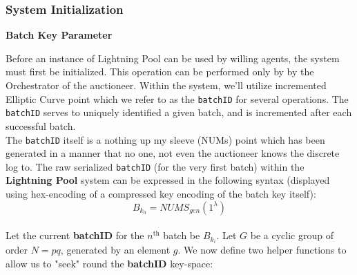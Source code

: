\documentclass[10pt,a4paper]{article}
\theoremstyle{definition}
\begin{document}
\subsubsection{System Initialization}

\begin{center}
    \textbf{Batch Key Parameter}
\end{center}

Before an instance of Lightning Pool can be used by willing agents, the system
must first be initialized. This operation can be performed only by by the
Orchestrator of the auctioneer. Within the system, we'll utilize incremented
Elliptic Curve point which we refer to as the \texttt{batchID} for several
operations. The \texttt{batchID} serves to uniquely identified a given batch,
and is incremented after each successful batch. \\

The \texttt{batchID} itself is a nothing up my sleeve (NUMs) point which has
been generated in a manner that no one, not even the auctioneer knows the
discrete log to. The raw serialized \texttt{batchID} (for the very first batch)
within the \textbf{Lightning Pool} system can be expressed in the following
syntax (displayed using hex-encoding of a compressed key encoding of the batch
key itself): \\
\[
    B_{k_0} = NUMS_{gen}(1^\lambda)
\] \\

Let the current \textbf{batchID} for the $n^{\text{th}}$ batch be $B_{k_i}$.
Let $G$ be a cyclic group of order $N=pq$, generated by an element $g$.  We now
define two helper functions to allow us to "seek" round the \textbf{batchID}
key-space:
\begin{pcvstack}[boxed,center, space=1em]
     \begin{pchstack}

     \end{pchstack}

     \begin{center}
     \end{center}
\end{pcvstack} %
\end{document}
